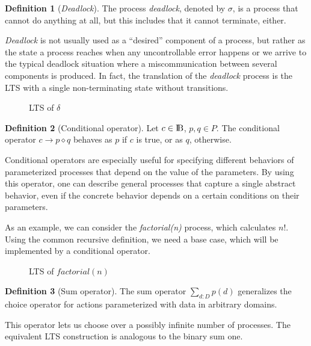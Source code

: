 \documentclass[11pt]{article}
\theoremstyle{definition}
\newtheorem{definition}{Definition}
\theoremstyle{plain}
\theoremstyle{definition}
\begin{document}
\begin{definition} [\textit{Deadlock}]
	The process \textit{deadlock}, denoted by $ \sigma $, is a process that cannot do anything at all, but this includes that it cannot terminate, either.
\end{definition}
\textit{Deadlock} is not usually used as a ``desired'' component of a process, but rather as the state a process reaches when any uncontrollable error happens or we arrive to the typical deadlock situation where a miscommunication between several components is produced. In fact, the translation of the \textit{deadlock} process is the LTS with a single non-terminating state without transitions.
\begin{figure} [H]
	\centering
	
	\caption{LTS of $\delta$} \label{fig:DeadlockDelta}
\end{figure}
\begin{definition} [Conditional operator]
	Let $ c \in \rm I\!B $, $ p, q \in P$. The conditional operator $ c\rightarrow p \diamond q $ behaves as $ p $ if $ c $ is true, or as $ q $, otherwise.
\end{definition}
Conditional operators are especially useful for specifying different behaviors of parameterized processes that depend on the value of the parameters. By using this operator, one can describe general processes that capture a single abstract behavior, even if the concrete behavior depends on a certain conditions on their parameters.

As an example, we can consider the \textit{factorial(n)} process, which calculates $ n! $. Using the common recursive definition, we need a base case, which will be implemented by a conditional operator.

\begin{figure} [H]
	\centering
	
	\caption{LTS of $factorial(n)$} \label{fig:ConditionalFactorial}
\end{figure}
\begin{definition} [Sum operator]
	The sum operator $ \sum_{d:D} p(d) $ generalizes the choice operator for actions parameterized with data in arbitrary domains.
\end{definition}

This operator lets us choose over a possibly infinite number of processes. The equivalent LTS construction is analogous to the binary sum one.
\end{document}
